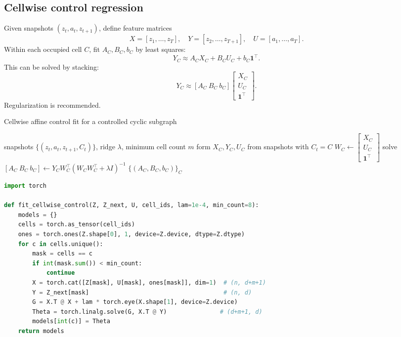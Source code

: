 \documentclass[11pt]{article}
\theoremstyle{definition}
\theoremstyle{plain}
\theoremstyle{remark}
\begin{document}
\subsection{Cellwise control regression}
Given snapshots $(z_t,a_t,z_{t+1})$, define feature matrices
\[
X=[z_1,\dots,z_T],\quad
Y=[z_2,\dots,z_{T+1}],\quad
U=[a_1,\dots,a_T].
\]
Within each occupied cell $C$, fit $A_C,B_C,b_C$ by least squares:
\[
Y_C \approx A_C X_C + B_C U_C + b_C\mathbf{1}^\top.
\]
This can be solved by stacking:
\[
Y_C \approx [A_C\ B_C\ b_C]
\begin{bmatrix}
X_C\\ U_C\\ \mathbf{1}^\top
\end{bmatrix}.
\]
Regularization is recommended.

\begin{algorithm}[t]
\caption{Cellwise affine control fit for a controlled cyclic subgraph}
\label{alg:dmdc}
\begin{algorithmic}[1]
\Require snapshots $\{(z_t,a_t,z_{t+1},C_t)\}$, ridge $\lambda$, minimum cell count $m$
\State form $X_C,Y_C,U_C$ from snapshots with $C_t=C$
\State $W_C \gets \begin{bmatrix}X_C\\ U_C\\ \mathbf{1}^\top\end{bmatrix}$
\State solve $[A_C\ B_C\ b_C] \gets Y_C W_C^\top (W_C W_C^\top + \lambda I)^{-1}$
\EndFor
\State \Return $\{(A_C,B_C,b_C)\}_C$
\end{algorithmic}
\end{algorithm}

\begin{lstlisting}[language=Python,caption={Cellwise affine control fitting (ridge-regularized).},label={lst:dmdc}]
import torch

def fit_cellwise_control(Z, Z_next, U, cell_ids, lam=1e-4, min_count=8):
    models = {}
    cells = torch.as_tensor(cell_ids)
    ones = torch.ones(Z.shape[0], 1, device=Z.device, dtype=Z.dtype)
    for c in cells.unique():
        mask = cells == c
        if int(mask.sum()) < min_count:
            continue
        X = torch.cat([Z[mask], U[mask], ones[mask]], dim=1)  # (n, d+m+1)
        Y = Z_next[mask]                                      # (n, d)
        G = X.T @ X + lam * torch.eye(X.shape[1], device=Z.device)
        Theta = torch.linalg.solve(G, X.T @ Y)               # (d+m+1, d)
        models[int(c)] = Theta
    return models
\end{lstlisting}
\end{document}
